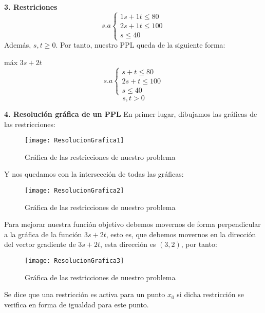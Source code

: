 \documentclass[11pt,fleqn]{book} %
\begin{document}
\textbf{3. Restriciones}
$$s.a\left\lbrace
\begin{array}{l}
  1s+1t \leq 80 \\
  2s+1t \leq 100 \\
  s \leq 40
\end{array}
\right.
$$
Además, $s, t \geq 0$.
Por tanto, nuestro PPL queda de la siguiente forma:
\begin{center}
  máx $3s+2t$
  $$s.a\left\lbrace
  \begin{array}{l}
	s+t \leq 80 \\
	2s+t \leq 100 \\
	s \leq 40
  \end{array}
  \right.
  $$
  $$s, t>0$$
\end{center}
\newpage
\textbf{4. Resolución gráfica de un PPL}
En primer lugar, dibujamos las gráficas de las restricciones:

\begin{figure}[h]
  \centering
  \texttt{[image: ResolucionGrafica1]}
  \caption[Gráfica de las restricciones de nuestro problema]{Gráfica de las restricciones de nuestro problema}
\end{figure}
Y nos quedamos con la intersección de todas las gráficas:
\begin{figure}[h]
  \centering
  \texttt{[image: ResolucionGrafica2]}
  \caption[Gráfica de las restricciones de nuestro problema]{Gráfica de las restricciones de nuestro problema}
\end{figure}
Para mejorar nuestra función objetivo debemos movernos de forma perpendicular a la gráfica de la función $3s+2t$, esto es, que debemos movernos en la dirección del vector gradiente de $3s+2t$, esta dirección es $(3, 2)$, por tanto:
\begin{figure}[!ht]
  \centering
  \texttt{[image: ResolucionGrafica3]}
  \caption[Gráfica de las restricciones de nuestro problema]{Gráfica de las restricciones de nuestro problema}
\end{figure}
\begin{definition}
  Se dice que una restricción es activa para un punto $x_0$ si dicha restricción se verifica en forma de igualdad para este punto.
\end{definition}
\end{document}
